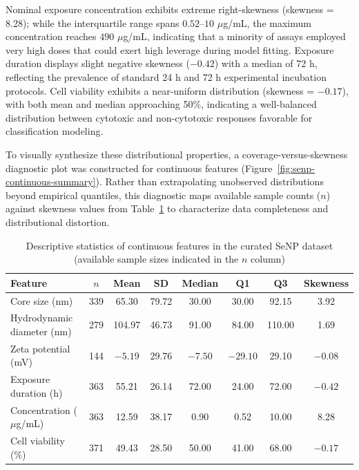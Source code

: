 Nominal exposure concentration exhibits extreme right-skewness (skewness = 8.28); while the interquartile range spans $0.52$--$10$ $\mu$g/mL, the maximum concentration reaches $490$ $\mu$g/mL, indicating that a minority of assays employed very high doses that could exert high leverage during model fitting. Exposure duration displays slight negative skewness ($-0.42$) with a median of 72 h, reflecting the prevalence of standard 24 h and 72 h experimental incubation protocols. Cell viability exhibits a near-uniform distribution (skewness = $-0.17$), with both mean and median approaching 50\%, indicating a well-balanced distribution between cytotoxic and non-cytotoxic responses favorable for classification modeling.

To visually synthesize these distributional properties, a coverage-versus-skewness diagnostic plot was constructed for continuous features (Figure~\ref{fig:senp-continuous-summary}). Rather than extrapolating unobserved distributions beyond empirical quantiles, this diagnostic maps available sample counts ($n$) against skewness values from Table~\ref{tab:senp_feature_statistics} to characterize data completeness and distributional distortion.

\begin{table}[H]
  \centering
  \caption{Descriptive statistics of continuous features in the curated SeNP dataset (available sample sizes indicated in the $n$ column)}
  \label{tab:senp_feature_statistics}
  \begin{tabular}{lccccccc}
    \hline
    Feature & $n$ & Mean & SD & Median & Q1 & Q3 & Skewness \\
    \hline
    Core size (nm)               & 339 & 65.30  & 79.72  & 30.00  & 30.00  & 92.15   & 3.92  \\
    Hydrodynamic diameter (nm)   & 279 & 104.97 & 46.73  & 91.00  & 84.00  & 110.00  & 1.69  \\
    Zeta potential (mV)          & 144 & $-5.19$ & 29.76  & $-7.50$ & $-29.10$ & 29.10 & $-0.08$ \\
    Exposure duration (h)        & 363 & 55.21  & 26.14  & 72.00  & 24.00  & 72.00   & $-0.42$ \\
    Concentration ($\mu$g/mL)    & 363 & 12.59  & 38.17  & 0.90   & 0.52   & 10.00   & 8.28  \\
    Cell viability (\%)          & 371 & 49.43  & 28.50  & 50.00  & 41.00  & 68.00   & $-0.17$ \\
    \hline
  \end{tabular}
\end{table}

